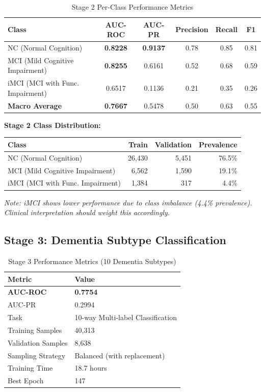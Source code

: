 \documentclass[11pt,a4paper]{article}
\begin{document}
\begin{table}[H]
\centering
\caption{Stage 2 Per-Class Performance Metrics}
\label{tab:stage2_perclass}
\begin{tabular}{@{}lccccc@{}}
\toprule
\textbf{Class} & \textbf{AUC-ROC} & \textbf{AUC-PR} & \textbf{Precision} & \textbf{Recall} & \textbf{F1} \\
\midrule
NC (Normal Cognition) & \textbf{0.8228} & \textbf{0.9137} & 0.78 & 0.85 & 0.81 \\
MCI (Mild Cognitive Impairment) & \textbf{0.8255} & 0.6161 & 0.52 & 0.68 & 0.59 \\
iMCI (MCI with Func. Impairment) & 0.6517 & 0.1136 & 0.21 & 0.35 & 0.26 \\
\midrule
\textbf{Macro Average} & \textbf{0.7667} & 0.5478 & 0.50 & 0.63 & 0.55 \\
\bottomrule
\end{tabular}
\end{table}

\textbf{Stage 2 Class Distribution:}
\begin{table}[H]
\centering
\begin{tabular}{@{}lrrr@{}}
\toprule
\textbf{Class} & \textbf{Train} & \textbf{Validation} & \textbf{Prevalence} \\
\midrule
NC (Normal Cognition) & 26,430 & 5,451 & 76.5\% \\
MCI (Mild Cognitive Impairment) & 6,562 & 1,590 & 19.1\% \\
iMCI (MCI with Func. Impairment) & 1,384 & 317 & 4.4\% \\
\bottomrule
\end{tabular}
\end{table}

\textit{Note: iMCI shows lower performance due to class imbalance (4.4\% prevalence). Clinical interpretation should weight this accordingly.}

\subsection{Stage 3: Dementia Subtype Classification}

\begin{table}[H]
\centering
\caption{Stage 3 Performance Metrics (10 Dementia Subtypes)}
\label{tab:stage3}
\begin{tabular}{@{}ll@{}}
\toprule
\textbf{Metric} & \textbf{Value} \\
\midrule
\textbf{AUC-ROC} & \textbf{0.7754} \\
AUC-PR & 0.2994 \\
Task & 10-way Multi-label Classification \\
Training Samples & 40,313 \\
Validation Samples & 8,638 \\
Sampling Strategy & Balanced (with replacement) \\
Training Time & 18.7 hours \\
Best Epoch & 147 \\
\bottomrule
\end{tabular}
\end{table}
\end{document}
